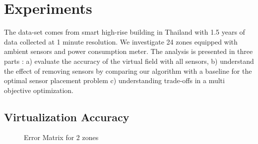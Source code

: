 \section{Experiments}
\label{chap:experiments }

The data-set \cite{pipattanasomporn2020cu} comes from smart high-rise building in Thailand with 1.5 years of data collected at 1 minute resolution. 
We investigate 24 zones equipped with ambient sensors and power consumption meter.  
The analysis is presented in three parts : a) evaluate the accuracy of the virtual field with all sensors, b) understand the effect of removing sensors by comparing our algorithm with a baseline for the optimal sensor placement problem c) understanding trade-offs in a multi objective optimization.  

\subsection{Virtualization Accuracy}

\begin{figure}
    \centering
    \qquad
    \caption{Error Matrix for 2 zones}
    \label{fig:zoneVirtualize}%
\end{figure}

